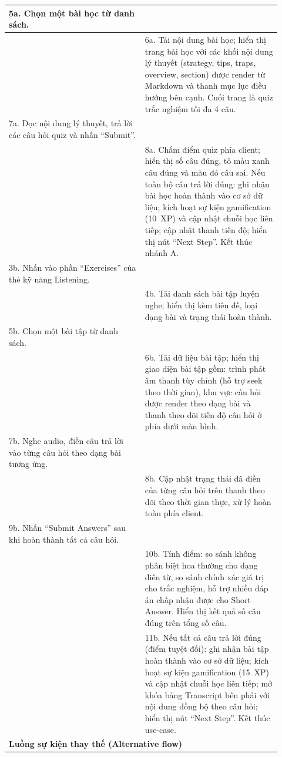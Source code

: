 \begin{longtable}{|p{0.46\linewidth}|p{0.46\linewidth}|}
    5a. Chọn một bài học từ danh sách. & \\ \hline
    & 6a. Tải nội dung bài học; hiển thị trang bài học với các khối nội dung lý thuyết (strategy, tips, traps, overview, section) được render từ Markdown và thanh mục lục điều hướng bên cạnh. Cuối trang là quiz trắc nghiệm tối đa 4 câu. \\ \hline
    7a. Đọc nội dung lý thuyết, trả lời các câu hỏi quiz và nhấn ``Submit''. & \\ \hline
    & 8a. Chấm điểm quiz phía client; hiển thị số câu đúng, tô màu xanh câu đúng và màu đỏ câu sai. Nếu toàn bộ câu trả lời đúng: ghi nhận bài học hoàn thành vào cơ sở dữ liệu; kích hoạt sự kiện gamification (10~XP) và cập nhật chuỗi học liên tiếp; cập nhật thanh tiến độ; hiển thị nút ``Next Step''. Kết thúc nhánh A. \\ \hline
    3b. Nhấn vào phần ``Exercises'' của thẻ kỹ năng Listening. & \\ \hline
    & 4b. Tải danh sách bài tập luyện nghe; hiển thị kèm tiêu đề, loại dạng bài và trạng thái hoàn thành. \\ \hline
    5b. Chọn một bài tập từ danh sách. & \\ \hline
    & 6b. Tải dữ liệu bài tập; hiển thị giao diện bài tập gồm: trình phát âm thanh tùy chỉnh (hỗ trợ seek theo thời gian), khu vực câu hỏi được render theo dạng bài và thanh theo dõi tiến độ câu hỏi ở phía dưới màn hình. \\ \hline
    7b. Nghe audio, điền câu trả lời vào từng câu hỏi theo dạng bài tương ứng. & \\ \hline
    & 8b. Cập nhật trạng thái đã điền của từng câu hỏi trên thanh theo dõi theo thời gian thực, xử lý hoàn toàn phía client. \\ \hline
    9b. Nhấn ``Submit Answers'' sau khi hoàn thành tất cả câu hỏi. & \\ \hline
    & 10b. Tính điểm: so sánh không phân biệt hoa thường cho dạng điền từ, so sánh chính xác giá trị cho trắc nghiệm, hỗ trợ nhiều đáp án chấp nhận được cho Short Answer. Hiển thị kết quả số câu đúng trên tổng số câu. \\ \hline
    & 11b. Nếu tất cả câu trả lời đúng (điểm tuyệt đối): ghi nhận bài tập hoàn thành vào cơ sở dữ liệu; kích hoạt sự kiện gamification (15~XP) và cập nhật chuỗi học liên tiếp; mở khóa bảng Transcript bên phải với nội dung đồng bộ theo câu hỏi; hiển thị nút ``Next Step''. Kết thúc use-case. \\ \hline
    \multicolumn{2}{|l|}{\textbf{Luồng sự kiện thay thế (Alternative flow)}} \\ \hline

\end{longtable}
